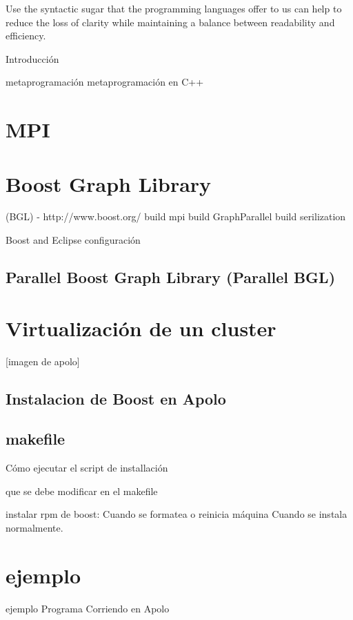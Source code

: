 \documentclass[twoside,letterpaper,12pt]{report}
\begin{document}
	Use the syntactic sugar that the programming languages offer to us can help to reduce the loss of clarity while maintaining a balance between readability and efficiency. \cite{boost} \cite{Karniadakis} \cite{wwwboost}


Introducción 

metaprogramación
metaprogramación en C++

\section{MPI}

\section{Boost Graph Library}

  (BGL) - http://www.boost.org/
	build mpi
	build GraphParallel
	build serilization

Boost and Eclipse
	configuración
	
\subsection{Parallel Boost Graph Library (Parallel BGL) }

\section{Virtualización de un cluster}[imagen de apolo]

\subsection{Instalacion de Boost en Apolo}


\subsection{makefile}

Cómo ejecutar el script de installación 

que se debe modificar en el makefile\cite{Wall2000}

instalar rpm de boost:
Cuando se formatea o reinicia máquina
Cuando se instala normalmente.

\section{ejemplo}

ejemplo Programa Corriendo en Apolo
\end{document}
